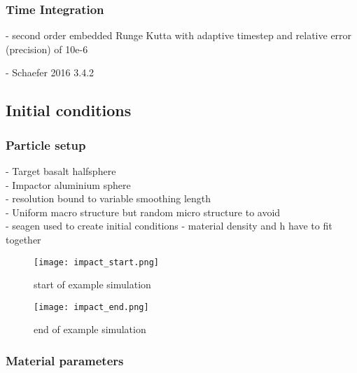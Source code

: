 \subsubsection{Time Integration}
- second order embedded Runge Kutta with adaptive timestep and relative error (precision) of 10e-6

- Schaefer 2016 3.4.2


\subsection{Initial conditions}
\subsubsection{Particle setup}
- Target basalt halfsphere \\
- Impactor aluminium sphere \\
- resolution bound to variable smoothing length \\
- Uniform macro structure but random micro structure to avoid \\
- seagen \cite{github:SEAGen} used to create initial conditions
- material density and h have to fit together

\begin{figure}[H]
    \centering
    \texttt{[image: impact\_start.png]}
    \caption{start of example simulation}
    \label{fig:impact_start}
\end{figure}

\begin{figure}[H]
    \centering
    \texttt{[image: impact\_end.png]}
    \caption{end of example simulation}
    \label{fig:impact_end}
\end{figure}

\subsubsection{Material parameters} \label{sect:material_parameters}

